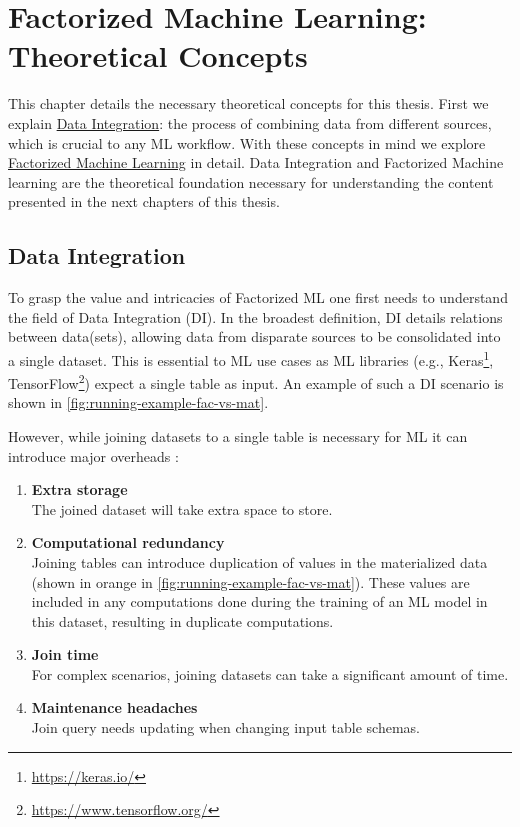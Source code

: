 
\chapter{Factorized Machine Learning: Theoretical Concepts}
\label{chapter:preliminary}

This chapter details the necessary theoretical concepts for this thesis. First we explain \hyperref[sec:2-data-integration]{Data Integration}: the process of combining data from different sources, which is crucial to any ML workflow. With these concepts in mind we explore \hyperref[sec:2-factorized-ml]{Factorized Machine Learning} in detail. Data Integration and Factorized Machine learning are the theoretical foundation necessary for understanding the content presented in the next chapters of this thesis.


\section{Data Integration}
\label{sec:2-data-integration}
To grasp the value and intricacies of Factorized ML one first needs to understand the field of Data Integration (DI). In the broadest definition, DI details relations between data(sets), allowing data from disparate sources to be consolidated into a single dataset. This is essential to ML use cases as ML libraries (e.g., Keras\footnote{\url{https://keras.io/}}, TensorFlow\footnote{\url{https://www.tensorflow.org/}}) expect a single table as input. An example of such a DI scenario is shown in \autoref{fig:running-example-fac-vs-mat}.


However, while joining datasets to a single table is necessary for ML it can introduce major overheads \cite{data-management-in-ML-kumar-2017}:

\begin{enumerate}
    \item \textbf{Extra storage}\\ The joined dataset will take extra space to store.
    \item \textbf{Computational redundancy} \\ Joining tables can introduce duplication of values in the materialized data (shown in orange in \autoref{fig:running-example-fac-vs-mat}). These values are included in any computations done during the training of an ML model in this dataset, resulting in duplicate computations.
    \item \textbf{Join time} \\For complex scenarios, joining datasets can take a significant amount of time.
    \item \textbf{Maintenance headaches} \\Join query needs updating when changing input table schemas.
\end{enumerate}

